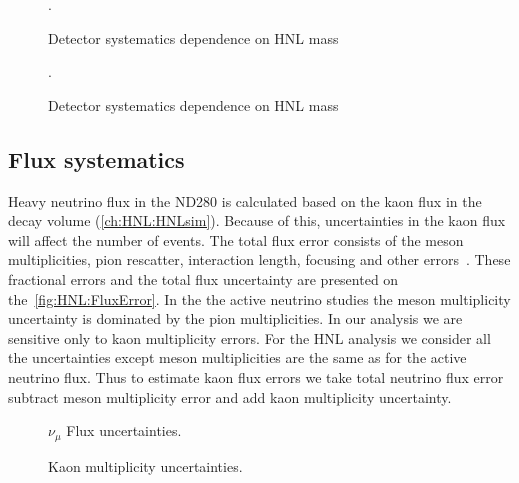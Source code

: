 \documentclass[../main.tex]{subfiles}
\begin{document}
\begin{figure}[!ht]
  \begin{minipage}{0.49\linewidth}
  \end{minipage}
  \begin{minipage}{0.49\linewidth}
  \end{minipage}
  \caption{Detector systematics dependence on HNL mass}.
  \label{fig:HNL:sys}
\end{figure}

\begin{figure}[!ht]
  \caption{Detector systematics dependence on HNL mass}.
  \label{fig:HNL:sysDimuon}
\end{figure}


\subsection{Flux systematics}

Heavy neutrino flux in the ND280 is calculated based on the kaon flux in the decay volume (\autoref{ch:HNL:HNLsim}). Because of this, uncertainties in the kaon flux will affect the number of events. The total flux error consists of the meson multiplicities, pion rescatter, interaction length, focusing and other errors~\cite{Abe2013}. These fractional errors and the total flux uncertainty are presented on the~\autoref{fig:HNL:FluxError}. In the the active neutrino studies the meson multiplicity uncertainty is dominated by the pion multiplicities. In our analysis we are sensitive only to kaon multiplicity errors. For the HNL analysis we consider all the uncertainties except meson multiplicities are the same as for the active neutrino flux. Thus to estimate kaon flux errors we take total neutrino flux error subtract meson multiplicity error and add kaon multiplicity uncertainty.

\begin{figure}[!ht]
\begin{minipage}{0.49\linewidth}
  \caption{$\nu_\mu$ Flux uncertainties.}
  \label{fig:HNL:FluxError}
\end{minipage}
\hfill
\begin{minipage}{0.49\linewidth}
  \caption{Kaon multiplicity uncertainties.}
  \label{fig:HNL:KaonMult}
\end{minipage}
\end{figure}
\end{document}
